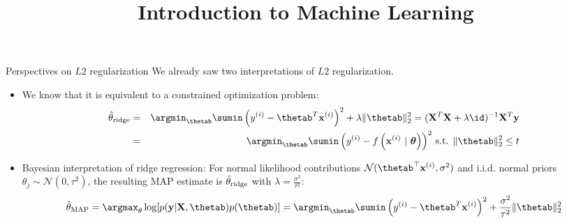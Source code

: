 \documentclass[11pt,compress,t,notes=noshow, xcolor=table]{beamer}
\title{Introduction to Machine Learning}
\begin{document}




\begin{vbframe}{Perspectives on $L2$ regularization}
We already saw two interpretations of $L2$ regularization. 
\begin{itemize}
    \item We know that it is equivalent to a constrained optimization problem:
  \begin{eqnarray*}  
  \thetah_{\text{ridge}} &=& \argmin_{\thetab} \sumin \left(\yi - \thetab^T \xi \right)^2 + \lambda \|\thetab\|_2^2 = ({\Xmat}^T \Xmat  + \lambda \id)^{-1} \Xmat^T\yv\\
  &=& \argmin_{\thetab} \sumin \left(\yi - \fxit\right)^2 \,
  \text{s.t. } \|\thetab\|_2^2  \leq t
  \end{eqnarray*}
  \item Bayesian interpretation of ridge regression: For normal likelihood contributions $\mathcal{N}(\thetab^{\top}\xi,\sigma^2)$ and i.i.d. normal priors $\theta_j \sim \mathcal{N}(0,\tau^{2})$, the resulting MAP estimate is $\hat{\theta}_{\text{ridge}}$ with $\lambda=\frac{\sigma^2}{\tau^2}$:
  $$\thetah_{\text{MAP}}=\argmax_{\theta} \log[p(\yv|\Xmat,\thetab)p(\thetab)] = \argmin_{\thetab} \sumin \left(\yi - \thetab^T \xi \right)^2 + \frac{\sigma^2}{\tau^2} \|\thetab\|_2^2$$
\end{itemize}

\end{vbframe}
\end{document}
